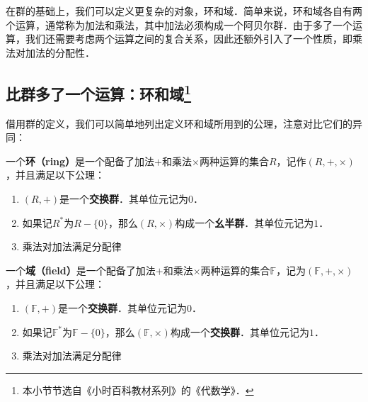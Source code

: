 

在群的基础上，我们可以定义更复杂的对象，环和域．简单来说，环和域各自有两个运算，通常称为加法和乘法，其中加法必须构成一个阿贝尔群．由于多了一个运算，我们还需要考虑两个运算之间的复合关系，因此还额外引入了一个性质，即乘法对加法的分配性．

\subsection{比群多了一个运算：环和域\footnote{本小节节选自《小时百科教材系列》的《代数学》．}}

借用群的定义，我们可以简单地列出定义环和域所用到的公理，注意对比它们的异同：

\begin{definition}{}
一个\textbf{环（ring）}是一个配备了加法$+$和乘法$\times$两种运算的集合$R$，记作$(R, +, \times)$，并且满足以下公理：
\begin{enumerate}
    \item $(R, +)$是一个\textbf{交换群}．其单位元记为$0$．
    \item 如果记$R^*$为$R-\{0\}$，那么$(R, \times)$构成一个\textbf{幺半群}．其单位元记为$1$．
    \item 乘法对加法满足分配律
\end{enumerate}
\end{definition}

\begin{definition}{}
一个\textbf{域（field）}是一个配备了加法$+$和乘法$\times$两种运算的集合$\mathbb{F}$，记为$(\mathbb{F}, +, \times)$，并且满足以下公理：

\begin{enumerate}
    \item $(\mathbb{F}, +)$是一个\textbf{交换群}．其单位元记为$0$．
    \item 如果记$\mathbb{F}^*$为$\mathbb{F}-\{0\}$，那么$(\mathbb{F}, \times)$构成一个\textbf{交换群}．其单位元记为$1$．
    \item 乘法对加法满足分配律
\end{enumerate}
\end{definition}


